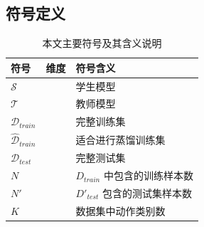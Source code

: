 \documentclass[10.5pt,letterpaper]{article}
\begin{document}
	\subsection{符号定义}
\label{define}
\begin{table}[!htb]
	\centering
	\caption{本文主要符号及其含义说明}
	\small 
	\begin{tabular}{lll}
		\toprule[0.75pt]
		符号             & 维度                                                                               & 符号含义                                  \\ \hline
		$\mathcal{S}$    &                                                                                   & 学生模型                                  \\
		
		$\mathcal{T}$    &                                                                                   & 教师模型                  \\
		$\mathcal{D}_{train}$              &                                                                                   & 完整训练集                 \\
		$\hat{\mathcal{D}}_{train}$              &                                                                                   & 适合进行蒸馏训练集                 \\
		$\mathcal{D}_{test}$              &                                                                                   & 完整测试集                 \\
		$N$              &                                                                                  & $D_{train}$ 中包含的训练样本数             \\
		$N'$          &                                                                                   & $D'_{test}$ 包含的测试集样本数             \\
		$K$          &                                                                                   & 数据集中动作类别数       \\
		

\end{tabular}
\end{table}
\end{document}
